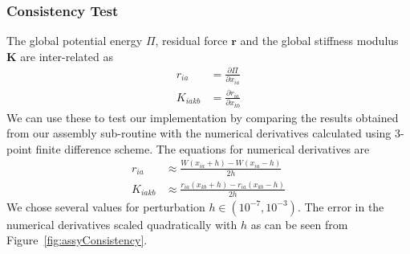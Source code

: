 \documentclass[../main.tex]{subfiles}
\begin{document}
\subsubsection{Consistency Test}
The global potential energy $\Pi$, residual force $\mathbf{r}$ and the
global stiffness modulus $\mathbf{K}$ are inter-related as
\begin{align*}
  r_{ia} &=\frac{\partial\Pi}{\partial x_{ia}} \\
  K_{iakb} &= \frac{\partial r_{ia}}{\partial x_{kb}}
\end{align*}
We can use these to test our implementation by comparing the results
obtained from our assembly sub-routine with the numerical derivatives
calculated using 3-point finite difference scheme. The equations for
numerical derivatives are
\begin{align*}
  r_{ia} &\approx \frac{W(x_{ia}+h) - W(x_{ia}-h)}{2h}\\
  K_{iakb} &\approx \frac{r_{ia}(x_{kb}+h)-r_{ia}(x_{kb}-h)}{2h}
\end{align*}
We chose several values for perturbation $h \in (10^{-7},10^{-3})$.
The error in the numerical derivatives scaled quadratically with $h$
as can be seen from Figure~\ref{fig:assyConsistency}.
\end{document}
